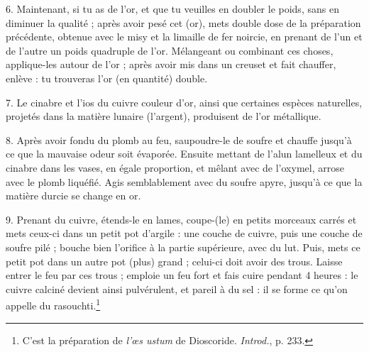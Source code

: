 \documentclass[a4paper, 11pt, oneside, polutonikogreek, french]{article}
\begin{document}
6. Maintenant, si tu as de l'or, et que tu veuilles en doubler le poids, sans en diminuer la qualité ; après avoir pesé cet (or), mets double dose de la préparation précédente, obtenue avec le misy et la limaille de fer noircie, en prenant de l'un et de l'autre un poids quadruple de l'or. Mélangeant ou combinant ces choses, applique-les autour de l'or ; après avoir mis dans un creuset et fait chauffer, enlève : tu trouveras l'or (en quantité) double.

7. Le cinabre et l'ios du cuivre couleur d'or, ainsi que certaines espèces naturelles, projetés dans la matière lunaire (l'argent), produisent de l'or métallique.

8. Après avoir fondu du plomb au feu, saupoudre-le de soufre et chauffe jusqu'à ce que la mauvaise odeur soit évaporée. Ensuite mettant de l'alun lamelleux et du cinabre dans les vases, en égale proportion, et mêlant avec de l'oxymel, arrose avec le plomb liquéfié. Agis semblablement avec du soufre apyre, jusqu'à ce que la matière durcie se change en or.

9. Prenant du cuivre, étends-le en lames, coupe-(le) en petits morceaux carrés et mets ceux-ci dans un petit pot d'argile : une couche de cuivre, puis une couche de soufre pilé ; bouche bien l'orifice à la partie supérieure, avec du lut. Puis, mets ce petit pot dans un autre pot (plus) grand ; celui-ci doit avoir des trous. Laisse entrer le feu par ces trous ; emploie un feu fort et fais cuire pendant 4 heures : le cuivre calciné devient ainsi pulvérulent, et pareil à du sel : il se forme ce qu'on appelle du rasouchti.\footnote{C'est la préparation de \emph{l'œs ustum} de Dioscoride. \emph{Introd.}, p. 233.}
\end{document}
